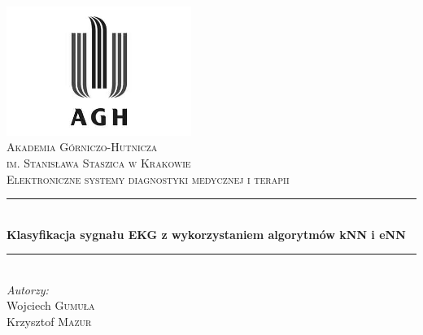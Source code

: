 \begin{titlepage}

\newcommand{\HRule}{\rule{\linewidth}{0.5mm}}

\center
 

\includegraphics[width=6cm]{img/logo.png}\\[1cm]
 
 

\textsc{\LARGE Akademia Górniczo-Hutnicza \\[0.2cm]
im. Stanisława Staszica w Krakowie}\\[1.5cm]

\textsc{\Large Elektroniczne systemy diagnostyki medycznej i terapii}\\[0.5cm]


\HRule \\[0.5cm]
{ \huge \bfseries Klasyfikacja sygnału EKG z wykorzystaniem algorytmów kNN i eNN}\\[0.3cm]
\HRule \\[1.5cm]

\flushright
\Large \emph{Autorzy:}\\
Wojciech \textsc{Gumuła}\\[0.1cm]
Krzysztof \textsc{Mazur}\\[3cm]


\end{titlepage}
